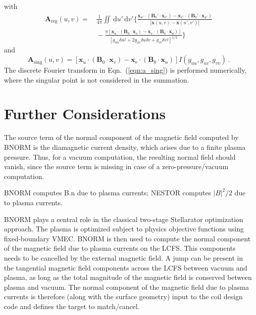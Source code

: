 with
\begin{align}
 \mathbf{A}_\textrm{reg}(u,v)
 =&\, \frac{1}{4 \pi} \iint \,\mathrm{d}u' \,\mathrm{d}v' \Biggl\{
      \frac{  \mathbf{x}_{u'} \cdot \left( \mathbf{B}_0' \cdot \mathbf{x}_{v'} \right)
            - \mathbf{x}_{v'} \cdot \left( \mathbf{B}_0' \cdot \mathbf{x}_{u'} \right) }
           {|\mathbf{x}(u,v) - \mathbf{x}(u',v')|} \nonumber \\
 ~&\,   - \frac{\pi \left[  \mathbf{x}_{u} \cdot \left( \mathbf{B}_0 \cdot \mathbf{x}_{v} \right)
                      - \mathbf{x}_{v} \cdot \left( \mathbf{B}_0 \cdot \mathbf{x}_{u} \right) \right] }
           {\left[ g_{uu} \delta u^2 + 2 g_{uv} \delta u \delta v + g_{vv} \delta v^2 \right]^{1/2} }
         \Biggr\} \label{eqn:a_sing}
\end{align}
and
\begin{equation}
 \mathbf{A}_\textrm{sing}(u,v)
 = \left[   \mathbf{x}_{u} \cdot \left( \mathbf{B}_0 \cdot \mathbf{x}_{v} \right)
          - \mathbf{x}_{v} \cdot \left( \mathbf{B}_0 \cdot \mathbf{x}_{u} \right) \right]
   I(g_{uu}, g_{uv}, g_{vv}) \, .
\end{equation}
The discrete Fourier transform in Eqn.~(\ref{eqn:a_sing}) is performed
numerically, where the singular point is not considered in the summation.





\FloatBarrier
\section{Further Considerations}
The source term of the normal component of the magnetic field computed by BNORM
is the diamagnetic current density, which arises due to a finite plasma pressure.
Thus, for a vacuum computation, the resulting normal field should vanish,
since the source term is missing in case of a zero-pressure/vacuum computation.


BNORM computes B.n due to plasma currents;
NESTOR computes $|B|^2/2$ due to plasma currents.

BNORM plays a central role in the classical two-stage Stellarator optimization approach.
The plasma is optimized subject to physics objective functions using fixed-boundary VMEC.
BNORM is then used to compute the normal component of the magnetic field due to plasma currents
on the LCFS. This components needs to be cancelled by the external magnetic field.
A jump can be present in the tangential magnetic field components across the LCFS
between vacuum and plasma, as long as the total magnitude of the magnetic field
is conserved between plasma and vacuum.
The normal component of the magnetic field due to plasma currents
is therefore (along with the surface geometry) input to the coil design code
and defines the target to match/cancel.

